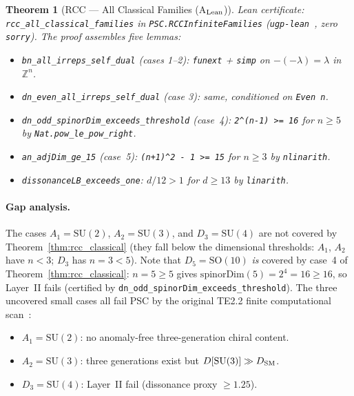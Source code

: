 \documentclass[11pt]{article}
\newtheorem{theorem}{Theorem}[section]
\theoremstyle{remark}
\begin{document}
\begin{theorem}[RCC --- All Classical Families (A$_{\rm Lean}$)]
\textit{Lean certificate:} \texttt{rcc\_all\_classical\_families} in \texttt{PSC.RCCInfiniteFamilies} (\texttt{ugp-lean}~\cite{ugp-lean}, zero \texttt{sorry}).  The proof assembles five lemmas:
\begin{sloppypar}
\begin{itemize}[leftmargin=1.5em,itemsep=1pt]
  \item \texttt{bn\_all\_irreps\_self\_dual} (cases 1--2): \texttt{funext} + \texttt{simp} on $-(-\lambda) = \lambda$ in $\mathbb{Z}^n$.
  \item \texttt{dn\_even\_all\_irreps\_self\_dual} (case 3): same, conditioned on \texttt{Even n}.
  \item \texttt{dn\_odd\_spinorDim\_exceeds\_threshold} (case~4): \texttt{2\^{}(n-1) >= 16} for $n \ge 5$ by \texttt{Nat.pow\_le\_pow\_right}.
  \item \texttt{an\_adjDim\_ge\_15} (case~5): \texttt{(n+1)\^{}2 - 1 >= 15} for $n \ge 3$ by \texttt{nlinarith}.
  \item \texttt{dissonanceLB\_exceeds\_one}: $d/12 > 1$ for $d \ge 13$ by \texttt{linarith}.
\end{itemize}
\end{sloppypar}
\end{theorem}

\paragraph{Gap analysis.}
The cases $A_1 = \mathrm{SU}(2)$, $A_2 = \mathrm{SU}(3)$, and $D_3 = \mathrm{SU}(4)$ are not covered by Theorem~\ref{thm:rcc_classical} (they fall below the dimensional thresholds: $A_1$, $A_2$ have $n < 3$; $D_3$ has $n = 3 < 5$).  Note that $D_5 = \mathrm{SO}(10)$ \emph{is} covered by case~4 of Theorem~\ref{thm:rcc_classical}: $n = 5 \ge 5$ gives $\mathrm{spinorDim}(5) = 2^4 = 16 \ge 16$, so Layer~II fails (certified by \texttt{dn\_odd\_spinorDim\_exceeds\_threshold}).  The three uncovered small cases all fail PSC by the original TE2.2 finite computational scan~\cite{SpivackNEMS05}:
\begin{itemize}[leftmargin=1.5em,itemsep=1pt]
  \item $A_1 = \mathrm{SU}(2)$: no anomaly-free three-generation chiral content.
  \item $A_2 = \mathrm{SU}(3)$: three generations exist but $D[\mathrm{SU}(3)] \gg D_{\rm SM}$.
  \item $D_3 = \mathrm{SU}(4)$: Layer~II fail (dissonance proxy $\ge 1.25$).
\end{itemize}
\end{document}
